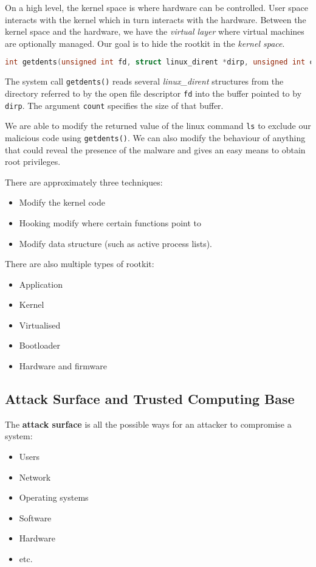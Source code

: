 \documentclass[11pt,a4paper,titlepage,dvipsnames,cmyk]{scrartcl}
\begin{document}
On a high level, the kernel space is where hardware can be controlled. User space interacts with the kernel which in turn interacts with the hardware. Between the kernel space and the hardware, we have the \textit{virtual layer} where virtual machines are optionally managed. Our goal is to hide the rootkit in the \textit{kernel space}.

\begin{lstlisting}[language=C]
int getdents(unsigned int fd, struct linux_dirent *dirp, unsigned int count);
\end{lstlisting}

The system call \texttt{getdents()} reads several \textit{linux\_dirent} structures from the directory referred to by the open file descriptor \texttt{fd} into the buffer pointed to by \texttt{dirp}. The argument \texttt{count} specifies the size of that buffer.

We are able to modify the returned value of the linux command \texttt{ls} to exclude our malicious code using \texttt{getdents()}. We can also modify the behaviour of anything that could reveal the presence of the malware and gives an easy means to obtain root privileges.

There are approximately three techniques:
\begin{itemize}
    \item Modify the kernel code
    \item Hooking modify where certain functions point to
    \item Modify data structure (such as active process lists).
\end{itemize}

There are also multiple types of rootkit:
\begin{itemize}
    \item Application
    \item Kernel
    \item Virtualised
    \item Bootloader
    \item Hardware and firmware
\end{itemize}

\subsection{Attack Surface and Trusted Computing Base}
The \textbf{attack surface} is all the possible ways for an attacker to compromise a system:
\begin{itemize}
    \item Users
    \item Network
    \item Operating systems
    \item Software
    \item Hardware
    \item etc.
\end{itemize}
\end{document}
